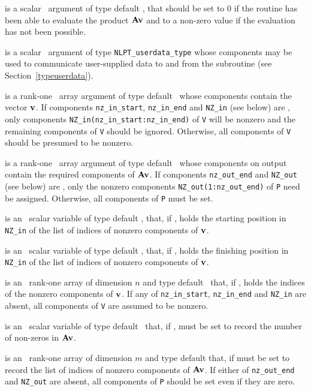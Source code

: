 \documentclass{galahad}
\begin{document}
\begin{description}
 is a scalar \intentout\ argument of type default \integer,
that should be set to 0 if the routine has been able to evaluate the
product ${\mathbf{A}} {\mathbf{v}}$
and to a non-zero value if the evaluation has not been possible.

 is a scalar \intentinout\ argument of type
{\tt NLPT\_userdata\_type} whose components may be used
to communicate user-supplied data to and from the
subroutine (see Section~\ref{typeuserdata}).

 is a rank-one \intentin\ array argument of type default \realdp\
whose components contain the vector ${\mathbf{v}}$.
If components
{\tt nz\_in\_start},
{\tt nz\_in\_end}
and
{\tt NZ\_in}
(see below) are \present,
only components {\tt NZ\_in(nz\_in\_start:nz\_in\_end)} of {\tt V}
will be nonzero and the remaining components of {\tt V} should be
ignored. Otherwise, all components of {\tt V} should be presumed to be nonzero.

 is a rank-one \intentout\ array argument of type default \realdp\
whose components on output contain the required components of ${\mathbf{A}} {\mathbf{v}}$.
If components
{\tt nz\_out\_end}
and
{\tt NZ\_out}
(see below) are \present,
only the nonzero components {\tt NZ\_out(1:nz\_out\_end)} of {\tt P}
need be assigned.
Otherwise, all components of {\tt P} must be set.

 is an \optional\ scalar variable of type default \integer,
that, if \present, holds the starting position in {\tt NZ\_in}
of the list of indices of nonzero components of ${\mathbf{v}}$.

 is an \optional\ scalar variable of type default \integer,
that, if \present, holds the finishing position in {\tt NZ\_in}
of the list of indices of nonzero components of ${\mathbf{v}}$.

 is an \optional\  rank-one array of dimension $n$
and type default \integer\ that, if \present, holds the indices of the
nonzero components of ${\mathbf{v}}$. If any of
{\tt nz\_in\_start},
{\tt nz\_in\_end}
and
{\tt NZ\_in}
are absent, all components of {\tt V} are assumed to be nonzero.

\itt{nz\_out\_end} is an \optional\ scalar variable of type default \integer\
that, if \present, must be set to record the number of non-zeros in
${\mathbf{A}} {\mathbf{v}}$.

\itt{NZ\_out} is an \optional\ rank-one array of dimension $m$
and type default \integer that, if \present must be set to record the list of
indices of nonzero components of ${\mathbf{A}} {\mathbf{v}}$.
If either of
{\tt nz\_out\_end}
and
{\tt NZ\_out}
are absent, all components of {\tt P} should be set even if they are zero.


\end{description}
\end{document}
